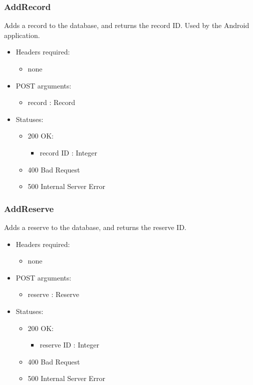     \subsubsection{AddRecord}
        Adds a record to the database, and returns the record ID. Used by the Android application.
        \begin{itemize}
            \item Headers required:
            \begin{itemize}
                \item none
            \end{itemize}
            \item POST arguments:
            \begin{itemize}
                \item record : Record
            \end{itemize}
            \item Statuses:
            \begin{itemize}
                \item 200 OK:
                \begin{itemize}
                    \item record ID : Integer
                \end{itemize}
                \item 400 Bad Request
                \item 500 Internal Server Error
             \end{itemize}
        \end{itemize}

    \subsubsection{AddReserve}
        Adds a reserve to the database, and returns the reserve ID.
        \begin{itemize}
            \item Headers required:
            \begin{itemize}
                \item none
            \end{itemize}
            \item POST arguments:
            \begin{itemize}
                \item reserve : Reserve
            \end{itemize}
            \item Statuses:
            \begin{itemize}
                \item 200 OK:
                \begin{itemize}
                    \item reserve ID : Integer
                \end{itemize}
                \item 400 Bad Request
                \item 500 Internal Server Error
            \end{itemize}
        \end{itemize}
    

